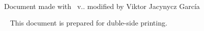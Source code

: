 {\vfill

\begin{large}

\begin{center}
  \textbf{\autorPortadaVal}%


\leavevmode \\\relax \mbox{ }%
\textoSegundoSubtituloPortadaVal \leavevmode \\[0.3]
\leavevmode \\\relax \mbox{ }%

\textbf{\institucionVal}\leavevmode \\[1em]
\textbf{\fechaPublicacionVal}

\end{center}

\end{large}

\vfill %


\restoregeometry


\newpage

\thispagestyle{empty}
\mbox{ }
\vfill%
\begin{small}
\begin{center}
\ifx\noTeXiSCreditsVal\undefined
  Document made with \texis\ v.\texisVer. modified by Viktor Jacynycz García
\else
\mbox{ }
\fi
\end{center}
\end{small}
\vspace*{2cm}
\begin{small}
\begin{center}
\ifx\explicacionDobleCaraVal\undefined
\mbox{ }
\else
\noindent This document is prepared for duble-side printing.
\fi
\end{center}
\end{small}


\newpage

\thispagestyle{empty}

}
